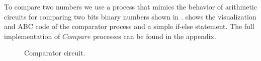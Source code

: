 To compare two numbers we use a process that mimics the behavior of arithmetic circuits for comparing two bits binary numbers shown in 
.
 shows the visualization and ABC code of the comparator process and a simple if-else statement.
The full implementation of $Compare$ processes can be found in the appendix.
\begin{figure}[H]%
\centering
{}
\caption{Comparator circuit.}
\label{tra_comparator_circuit}%
\end{figure}


